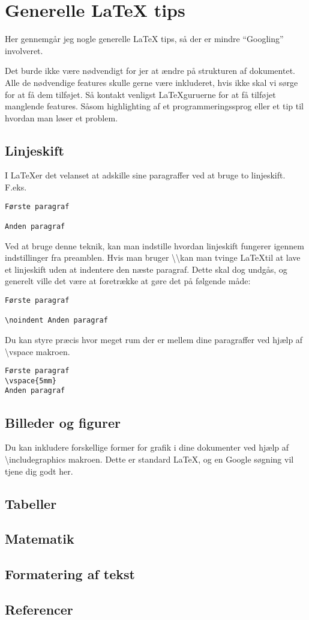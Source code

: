 \chapter{Generelle LaTeX tips}
Her gennemgår jeg nogle generelle LaTeX tips, så der er mindre ``Googling'' 
involveret.

Det burde ikke være nødvendigt for jer at ændre på strukturen af dokumentet. 
Alle de nødvendige features skulle gerne være inkluderet, hvis ikke skal vi 
sørge for at få dem tilføjet. Så kontakt venligst \LaTeX guruerne for at få 
tilføjet manglende features. Såsom highlighting af et programmeringssprog eller 
et tip til hvordan man løser et problem.

\section{Linjeskift}
I \LaTeX er det velanset at adskille sine paragraffer ved at bruge to 
linjeskift. F.eks.
\begin{verbatim}
Første paragraf

Anden paragraf
\end{verbatim}
Ved at bruge denne teknik, kan man indstille hvordan linjeskift fungerer 
igennem indstillinger fra preamblen. Hvis man bruger 
\textbackslash\textbackslash kan man tvinge \LaTeX til at lave et linjeskift 
uden at indentere den næste paragraf. Dette skal dog undgås, og generelt ville 
det være at foretrække at gøre det på følgende måde:
\begin{verbatim}
Første paragraf

\noindent Anden paragraf
\end{verbatim}

\noindent Du kan styre præcis hvor meget rum der er mellem dine paragraffer ved 
hjælp af 
\textbackslash vspace makroen.
\begin{verbatim}
Første paragraf
\vspace{5mm}
Anden paragraf
\end{verbatim}

\section{Billeder og figurer}
Du kan inkludere forskellige former for grafik i dine dokumenter ved hjælp af 
\textbackslash includegraphics makroen. Dette er standard \LaTeX, og en Google 
søgning vil tjene dig godt her.

\section{Tabeller}

\section{Matematik}

\section{Formatering af tekst}

\section{Referencer}